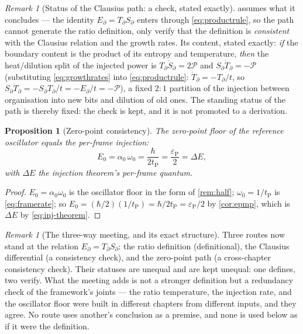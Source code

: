 \documentclass[11pt]{amsbook}
\theoremstyle{plain}
\newtheorem{proposition}[theorem]{Proposition}
\theoremstyle{definition}
\theoremstyle{remark}
\newtheorem{remark}[theorem]{Remark}
\newcommand{\uses}[1]{\par\nopagebreak\noindent{\footnotesize\emph{Uses: #1.}\par}}
\begin{document}
\begin{remark}[Status of the Clausius path: a check, stated exactly]\label{rem:clausius-status}
 assumes what it concludes --- the identity $E_{\partial} = T_{\partial}S_{\partial}$ enters through \cref{eq:productrule}, so the path cannot generate the ratio definition, only verify that the definition is \emph{consistent} with the Clausius relation and the growth rates. Its content, stated exactly: \emph{if} the boundary content is the product of its entropy and temperature, \emph{then} the heat/dilution split of the injected power is $T_{\partial}\dot S_{\partial} = 2\mathcal P$ and $S_{\partial}\dot T_{\partial} = -\mathcal P$ (substituting \cref{eq:growthrates} into \cref{eq:productrule}: $\dot T_{\partial} = -T_{\partial}/t$, so $S_{\partial}\dot T_{\partial} = -S_{\partial}T_{\partial}/t = -E_{\partial}/t = -\mathcal P$), a fixed $2{:}1$ partition of the injection between organisation into new bits and dilution of old ones. The standing status of the path is thereby fixed: the check is kept, and it is not promoted to a derivation.
\end{remark}

\begin{proposition}[Zero-point consistency]\label{prop:zeropoint-check}
The zero-point floor of the reference oscillator equals the per-frame injection:
\begin{equation}\label{eq:zeropoint-check}
E_{0} = \alpha_{0}\,\omega_{0} = \frac{\hbar}{2t_{\mathrm P}} = \frac{\varepsilon_{\mathrm P}}{2} = \Delta E,
\end{equation}
with $\Delta E$ the injection theorem's per-frame quantum.
\uses{\cref{thm:spectrum}, \cref{as:p}, \cref{thm:injection}}
\end{proposition}

\begin{proof}
$E_{0} = \alpha_{0}\omega_{0}$ is the oscillator floor in the form of \cref{rem:half}; $\omega_{0} = 1/t_{\mathrm P}$ is \cref{eq:framerate}; so $E_{0} = (\hbar/2)(1/t_{\mathrm P}) = \hbar/2t_{\mathrm P} = \varepsilon_{\mathrm P}/2$ by \cref{cor:epmp}, which is $\Delta E$ by \cref{eq:inj-theorem}.
\end{proof}

\begin{remark}[The three-way meeting, and its exact structure]\label{rem:three-way}
Three routes now stand at the relation $E_{\partial} = T_{\partial}S_{\partial}$: the ratio definition (definitional), the Clausius differential (a consistency check), and the zero-point path (a cross-chapter consistency check). Their statuses are unequal and are kept unequal: one defines, two verify. What the meeting adds is not a stronger definition but a redundancy check of the framework's joints --- the ratio temperature, the injection rate, and the oscillator floor were built in different chapters from different inputs, and they agree. No route uses another's conclusion as a premise, and none is used below as if it were the definition.
\end{remark}
\end{document}
